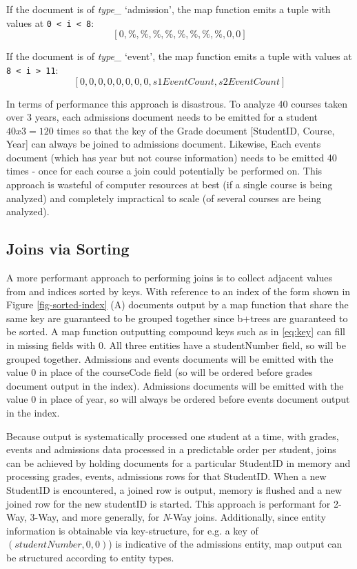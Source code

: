 If the document is of \textit{type\_} `admission', the map function emits a tuple with values at \texttt{0 < i < 8}: \[[0, \%, \%, \%, \%, \%, \%, \%, \%, 0, 0]\]

If the document is of \textit{type\_} ‘event’, the map function emits a tuple with values at \texttt{8 < i > 11}: \[[0, 0, 0, 0, 0, 0, 0, 0, s1EventCount, s2EventCount]\]

In terms of performance this approach is disastrous. To analyze 40 courses taken over 3 years, each admissions document needs to be emitted for a student $40 x 3 = 120$ times so that the key of the Grade document [StudentID, Course, Year] can always be joined to admissions document. Likewise, Each events document (which has year but not course information) needs to be emitted 40 times - once for each course a join could potentially be performed on. This approach is wasteful of computer resources at best (if a single course is being analyzed) and completely impractical to scale (of several courses are being analyzed).

\subsection{Joins via Sorting}
A more performant approach to performing joins is to collect adjacent values from and indices sorted by keys. With reference to an index of the form shown in Figure \ref{fig-sorted-index} (A) documents output by a map function that share the same key are guaranteed to be grouped together since b+trees are guaranteed to be sorted. A map function outputting compound keys such as in \ref{eq:key} can fill in missing fields with $0$. All three entities have a studentNumber field, so will be grouped together. Admissions and events documents will be emitted with the value $0$ in place of the courseCode field (so will be ordered before grades document output in the index). Admissions documents will be emitted with the value $0$ in place of year, so will always be ordered before events document output in the index.

Because output is systematically processed one student at a time, with grades, events and admissions data processed in a predictable order per student, joins can be achieved by holding documents for a particular StudentID in memory and processing grades, events, admissions rows for that StudentID. When a new StudentID is encountered, a joined row is output, memory is flushed and a new joined row for the new studentID is started. This approach is performant for 2-Way, 3-Way, and more generally, for \textit{N}-Way joins. Additionally, since entity information is obtainable via key-structure, for e.g. a key of $(studentNumber,0,0)$) is indicative of the admissions entity, map output can be structured according to entity types.

